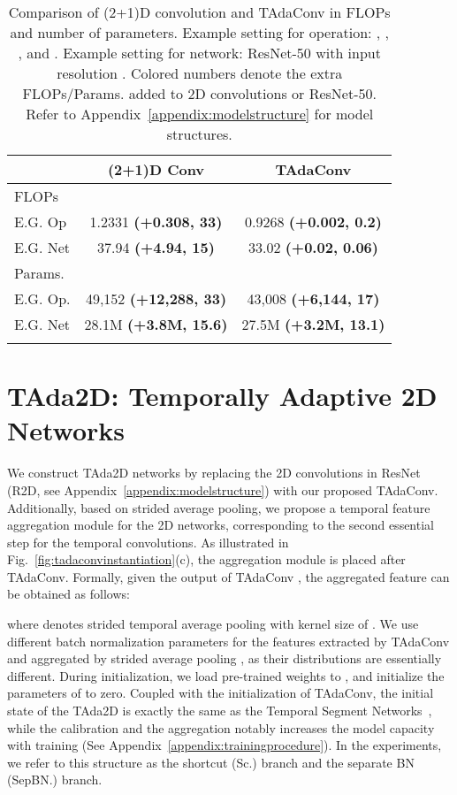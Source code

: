 \documentclass{article} \usepackage{iclr2022_conference,times}
\newcommand{\tablestyle}[2]{\setlength{\tabcolsep}{#1}\renewcommand{\arraystretch}{#2}\centering\small}
\begin{document}
\begin{table}[t]
\caption{
Comparison of (2+1)D convolution and TAdaConv in FLOPs and number of parameters. 
Example setting for operation: , , ,  and . 
Example setting for network: ResNet-50 with input resolution .
Colored numbers denote the extra FLOPs/Params. added to 2D convolutions or ResNet-50.
Refer to Appendix~\ref{appendix:modelstructure} for model structures.
}
\vspace{-2mm}
\centering
\tablestyle{8pt}{1.0}
\begin{tabular}{lcc}
\shline
 ~& \textbf{(2+1)D Conv} & \textbf{TAdaConv} \\
\hline
\multirow{2}{*}{FLOPs} &  &  \\
 &  &  \\
E.G. Op & 1.2331 {\color{red}\textbf{(+0.308, 33)}} & 0.9268 {\color{forestgreen}\textbf{(+0.002, 0.2)}}\\
E.G. Net & 37.94 {\color{red}\textbf{(+4.94, 15)}} & 33.02 {\color{forestgreen}\textbf{(+0.02, 0.06)}} \\
\hline
Params. &  & \\
E.G. Op.& 49,152 {\color{red}\textbf{(+12,288, 33)}} & 43,008 {\color{forestgreen}\textbf{(+6,144, 17)}}\\
E.G. Net & 28.1M {\color{red}\textbf{(+3.8M, 15.6)}}& 27.5M {\color{forestgreen}\textbf{(+3.2M, 13.1)}}\\
\shline
\end{tabular}
\label{tab:temporalmodellingcomparison}
\vspace{-3mm}
\end{table}

\section{TAda2D: Temporally Adaptive 2D Networks}
\label{Sec:TempAgg}
We construct TAda2D networks by replacing the 2D convolutions in ResNet (R2D, see Appendix~\ref{appendix:modelstructure}) with our proposed TAdaConv.
Additionally, based on strided average pooling, we propose a temporal feature aggregation module for the 2D networks, corresponding to the second essential step for the temporal convolutions.
As illustrated in Fig.~\ref{fig:tadaconvinstantiation}(c), the aggregation module is placed after TAdaConv. 
Formally, given the output of TAdaConv , the aggregated feature can be obtained as follows:

\noindent where  denotes strided temporal average pooling with kernel size of . 
We use different batch normalization parameters for the features extracted by TAdaConv  and aggregated by strided average pooling , as their distributions are essentially different. 
During initialization, we load pre-trained weights to , and initialize the parameters of  to zero. 
Coupled with the initialization of TAdaConv, the initial state of the TAda2D is exactly the same as the Temporal Segment Networks~\citep{tsn}, while the calibration and the aggregation notably increases the model capacity with training (See Appendix~\ref{appendix:trainingprocedure}).
In the experiments, we refer to this structure as the shortcut (Sc.) branch and the separate BN (SepBN.) branch.
\end{document}
